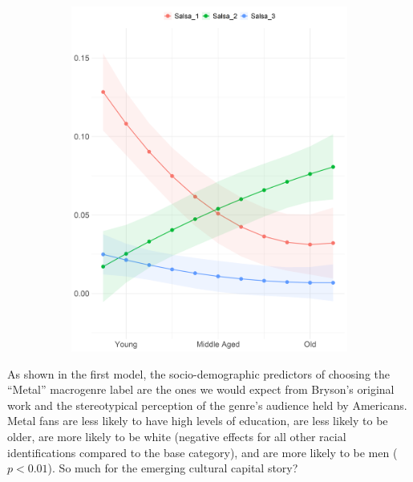 \documentclass[a4paper,12pt]{extarticle}
\begin{document}
\begin{figure}[t!]
\begin{subfigure}[b]{0.45\textwidth}
        \includegraphics[width=1.0\textwidth]{Plots/Micro/micro-by-age-salsa.png}
        \caption{}
        \label{fig:age-latin}
    \end{subfigure}
\end{figure}

As shown in the first model, the socio-demographic predictors of choosing the ``Metal'' macrogenre label are the ones we would expect from Bryson's original work and the stereotypical perception of the genre's audience held by Americans. Metal fans are less likely to have high levels of education, are less likely to be older, are more likely to be white (negative effects for all other racial identifications compared to the base category), and are more likely to be men ($p<0.01$). So much for the emerging cultural capital story?
\end{document}
